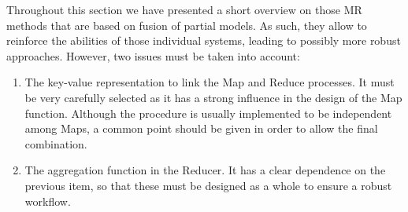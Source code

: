 \documentclass[3p,review]{elsarticle}
\begin{document}






Throughout this section we have presented a short overview on those MR methods that are based on fusion of partial models. As such, they allow to reinforce the abilities of those individual systems, leading to possibly more robust approaches. However, two issues must be taken into account:

\begin{enumerate}
\item The key-value representation to link the Map and Reduce processes. It must be very carefully selected as it has a strong influence in the design of the Map function. Although the procedure is usually implemented to be independent among Maps, a common point should be given in order to allow the final combination. 

\item The aggregation function in the Reducer. It has a clear dependence on the previous item, so that these must be designed as a whole to ensure a robust workflow.

\end{enumerate}
\end{document}
